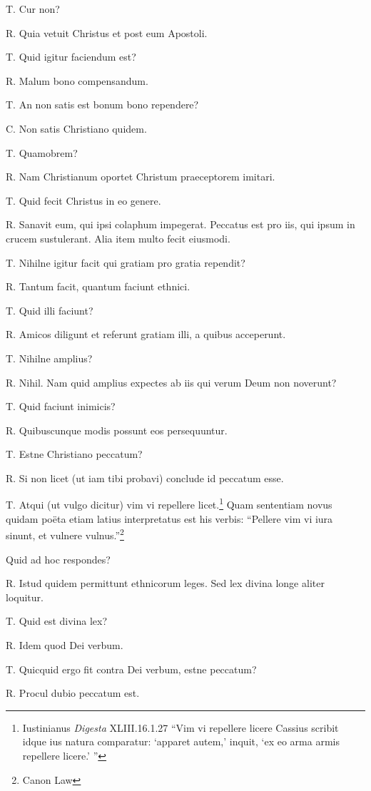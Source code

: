 \documentclass{article}
\begin{document}
T. Cur non?

R. Quia vetuit Christus et post eum Apostoli.

T. Quid igitur faciendum est?

R. Malum bono compensandum.

T. An non satis est bonum bono rependere?

C. Non satis Christiano quidem.

T. Quamobrem?

R. Nam Christianum oportet Christum praeceptorem imitari.

T. Quid fecit Christus in eo genere.

R. Sanavit eum, qui ipsi colaphum impegerat. Peccatus est pro iis, qui ipsum in crucem sustulerant. Alia item multo fecit eiusmodi.

T. Nihilne igitur facit qui gratiam pro gratia rependit?

R. Tantum facit, quantum faciunt ethnici.

T. Quid illi faciunt?

R. Amicos diligunt et referunt gratiam illi, a quibus acceperunt.

T. Nihilne amplius?

R. Nihil. Nam quid amplius expectes ab iis qui verum Deum non noverunt?

T. Quid faciunt inimicis?

R. Quibuscunque modis possunt eos persequuntur.

T. Estne Christiano peccatum?

R. Si non licet (ut iam tibi probavi) conclude id peccatum esse.

T. Atqui (ut vulgo dicitur) vim vi repellere licet.\footnote{Iustinianus \emph{Digesta} XLIII.16.1.27 ``Vim vi repellere licere Cassius scribit idque ius natura comparatur: `apparet autem,' inquit, `ex eo arma armis repellere licere.' ''} Quam sententiam novus quidam poëta etiam latius interpretatus est his verbis: ``Pellere vim vi iura sinunt, et vulnere vulnus.''\footnote{Canon Law}

Quid ad hoc respondes?

R. Istud quidem permittunt ethnicorum leges. Sed lex divina longe aliter loquitur.

T. Quid est divina lex?

R. Idem quod Dei verbum.

T. Quicquid ergo fit contra Dei verbum, estne peccatum?

R. Procul dubio peccatum est.
\end{document}
